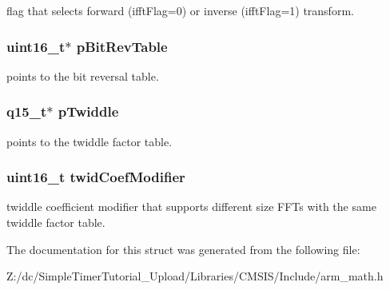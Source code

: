 flag that selects forward (ifft\-Flag=0) or inverse (ifft\-Flag=1) transform. \hypertarget{structarm__cfft__radix4__instance__q15_a46a2fb328199897af100fea0bfdf59aa}{
\subsubsection[{p\-Bit\-Rev\-Table}]{\setlength{\rightskip}{0pt plus 5cm}uint16\-\_\-t$\ast$ p\-Bit\-Rev\-Table}}\label{structarm__cfft__radix4__instance__q15_a46a2fb328199897af100fea0bfdf59aa}
points to the bit reversal table. \hypertarget{structarm__cfft__radix4__instance__q15_aa8c837c05b2c910342ab8f171d30dc02}{
\subsubsection[{p\-Twiddle}]{\setlength{\rightskip}{0pt plus 5cm}q15\-\_\-t$\ast$ p\-Twiddle}}\label{structarm__cfft__radix4__instance__q15_aa8c837c05b2c910342ab8f171d30dc02}
points to the twiddle factor table. \hypertarget{structarm__cfft__radix4__instance__q15_afe772e5b5001c9d8e85032115a8df5bf}{
\subsubsection[{twid\-Coef\-Modifier}]{\setlength{\rightskip}{0pt plus 5cm}uint16\-\_\-t twid\-Coef\-Modifier}}\label{structarm__cfft__radix4__instance__q15_afe772e5b5001c9d8e85032115a8df5bf}
twiddle coefficient modifier that supports different size F\-F\-Ts with the same twiddle factor table. 

The documentation for this struct was generated from the following file\-:\begin{DoxyCompactItemize}
\item 
Z\-:/dc/\-Simple\-Timer\-Tutorial\-\_\-\-Upload/\-Libraries/\-C\-M\-S\-I\-S/\-Include/arm\-\_\-math.\-h\end{DoxyCompactItemize}
